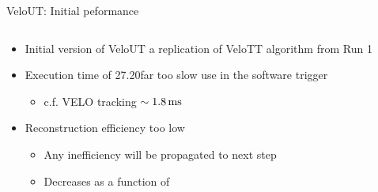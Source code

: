 \documentclass[aspectratio=1610]{beamer}
\begin{document}
\begin{frame}{VeloUT: Initial peformance}

\begin{columns}
\begin{column}{0.65\textwidth}

\begin{itemize}
  \item Initial version of VeloUT a replication of VeloTT algorithm from Run 1
\end{itemize}

\begin{itemize}
  \item Execution time of 27.20\ms far too slow use in the software trigger
  \begin{itemize}
    \item[\ding{70}] c.f. VELO tracking $\sim1.8{\mathrm{ \,ms}}$
  \end{itemize}
  \item Reconstruction efficiency too low
  \begin{itemize}
    \item[\ding{70}] Any inefficiency will be propagated to next step
    \item[\ding{70}] Decreases as a function of \ptot
  \end{itemize}
\end{itemize}

\bigskip

\begin{mdframed}[linecolor=barcolor]
\begin{center}
\end{center}
\end{mdframed}
\end{column}


\end{columns}
\end{frame}
\end{document}
